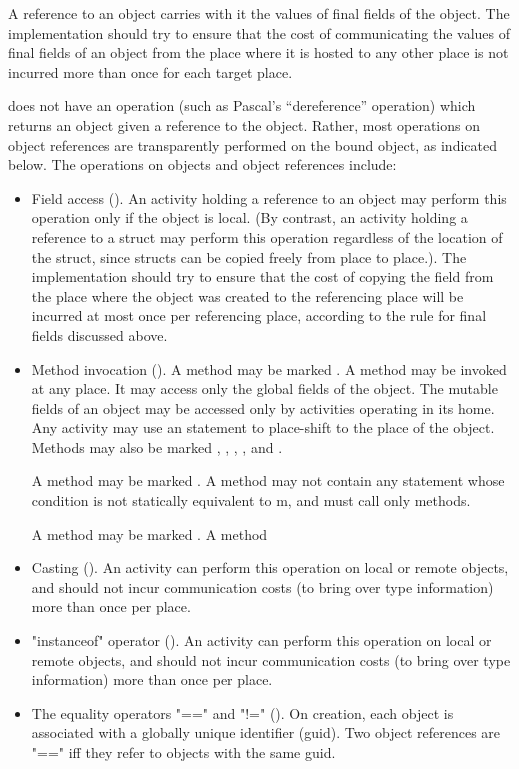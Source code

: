 A reference to an object carries with it the values of final  fields
of the object. The implementation should try to ensure that the cost
of communicating the values of final fields of an object from the
place where it is hosted to any other place is not incurred more than
once for each target place.

{}\Xten{} does not have an operation (such as Pascal's ``dereference''
operation) which returns an object given a reference to the
object. Rather, most operations on object references are transparently
performed on the bound object, as indicated below. The operations on
objects and object references include:
\begin{itemize}

{}\item Field access (). An activity holding a
reference to an object may perform this operation only if the
object is local.  (By contrast, an activity holding a reference to a struct
may perform this operation regardless of the location of the struct, 
since structs can be copied freely from place to place.).  The
implementation should try to ensure that the cost of copying the field
from the place where the object was created to the referencing place
will be incurred at most once per referencing place, according to the
rule for final fields discussed above.

\item Method invocation ().  A method may be
  marked . A  method may be invoked at any
  place. It may access only the global fields of the object. The
  mutable fields of an object may be accessed only by activities
  operating in its home.  Any activity may use an  statement
  to place-shift to the place of the object. Methods may also be
  marked , , ,
  , and .


A method may be marked .  A  method
may not contain any  statement whose condition is not
statically equivalent to m, and must call only
 methods.


A method may be marked . A  method 

{}\item Casting ().  An activity can perform this
operation on local or remote objects, and should not incur
communication costs (to bring over type information) more than once
per place.

{}\item \xcd"instanceof" operator ().  An activity
can perform this operation on local or remote objects, and should not
incur communication costs (to bring over type information) more than
once per place.

\item The equality operators \xcd"==" and \xcd"!="
(). On creation, each object is associated with a globally
unique identifier (guid). Two object references are \xcd"==" iff they refer to objects
with the  same guid.

\end{itemize}

